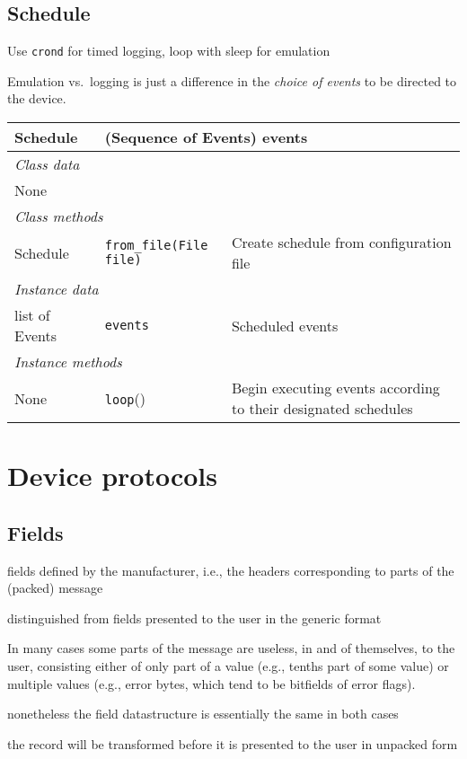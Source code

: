 \documentclass[pdftex,oneside,12pt,a4paper]{book}
\begin{document}
\section{Schedule}
Use \verb|crond| for timed logging, loop with sleep for emulation

Emulation vs.\ logging is just a difference in the \emph{choice of events} to be directed to the device.

\noindent
\begin{tabular}{|p{0.2\linewidth}p{0.28\linewidth}p{0.52\linewidth}|}
\hline
Schedule & \multicolumn{2}{l|}{(Sequence of Events) events} \\
\hline\multicolumn{3}{|l|}{\small\emph{Class data}}\\
None & & \\
\hline\multicolumn{3}{|l|}{\small\emph{Class methods}}\\
Schedule & \verb|from_file(File file)| & Create schedule from configuration file \\
\hline\multicolumn{3}{|l|}{\small\emph{Instance data}}\\
list of Events & \verb|events| & Scheduled events \\
\hline\multicolumn{3}{|l|}{\small\emph{Instance methods}}\\
None & \verb|loop|() & Begin executing events according to their designated schedules \\\hline
\end{tabular}

\chapter{Device protocols}
\section{Fields}
fields defined by the manufacturer, i.e., the headers corresponding to parts of the (packed) message

distinguished from fields presented to the user in the generic format

In many cases some parts of the message are useless, in and of themselves, to the user, consisting either of only part of a value (e.g., tenths part of some value) or multiple values (e.g., error bytes, which tend to be bitfields of error flags).

nonetheless the field datastructure is essentially the same in both cases

the record will be transformed before it is presented to the user in unpacked form
\end{document}
